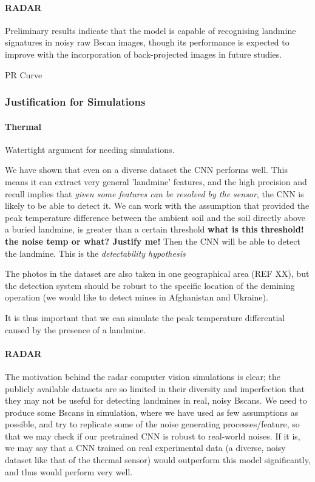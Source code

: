     \paragraph{RADAR} Preliminary results indicate that the model is capable of recognising landmine signatures in noisy raw Bscan images, though its performance is expected to improve with the incorporation of back-projected images in future studies.

    PR Curve
    
\subsubsection{Justification for Simulations} \label{simulation_justification}


    \paragraph{Thermal} Watertight argument for needing simulations.
    
    We have shown that even on a diverse dataset the CNN performs well. This means it can extract very general 'landmine' features, and the high precision and recall implies that \textit{given some features can be resolved by the sensor}, the CNN is likely to be able to detect it. We can work with the assumption that provided the peak temperature difference between the ambient soil and the soil directly above a buried landmine, is greater than a certain threshold \textbf{what is this threshold! the noise temp or what? Justify me!} Then the CNN will be able to detect the landmine. This is the \textit{detectability hypothesis}
    
    The photos in the dataset are also taken in one geographical area (REF XX), but the detection system should be robust to the specific location of the demining operation (we would like to detect mines in Afghanistan and Ukraine). 
    
    It is thus important that we can simulate the peak temperature differential caused by the presence of a landmine.
    
    \paragraph{RADAR} The motivation behind the radar computer vision simulations is clear; the publicly available datasets are so limited in their diversity and imperfection that they may not be useful for detecting landmines in real, noisy Bscans. We need to produce some Bscans in simulation, where we have used as few assumptions as possible, and try to replicate some of the noise generating processes/feature, so that we may check if our pretrained CNN is robust to real-world noises. If it is, we may say that a CNN trained on real experimental data (a diverse, noisy dataset like that of the thermal sensor) would outperform this model significantly, and thus would perform very well.



